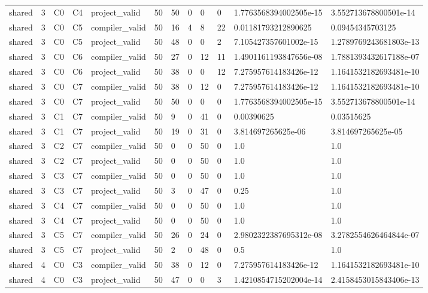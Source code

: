 \begin{tabular}{llllllllllll}
shared & 3 & C0 & C4 & project\_valid & 50 & 50 & 0 & 0 & 0 & 1.7763568394002505e-15 & 3.552713678800501e-14 \\
shared & 3 & C0 & C5 & compiler\_valid & 50 & 16 & 4 & 8 & 22 & 0.01181793212890625 & 0.09454345703125 \\
shared & 3 & C0 & C5 & project\_valid & 50 & 48 & 0 & 0 & 2 & 7.105427357601002e-15 & 1.2789769243681803e-13 \\
shared & 3 & C0 & C6 & compiler\_valid & 50 & 27 & 0 & 12 & 11 & 1.4901161193847656e-08 & 1.7881393432617188e-07 \\
shared & 3 & C0 & C6 & project\_valid & 50 & 38 & 0 & 0 & 12 & 7.275957614183426e-12 & 1.1641532182693481e-10 \\
shared & 3 & C0 & C7 & compiler\_valid & 50 & 38 & 0 & 12 & 0 & 7.275957614183426e-12 & 1.1641532182693481e-10 \\
shared & 3 & C0 & C7 & project\_valid & 50 & 50 & 0 & 0 & 0 & 1.7763568394002505e-15 & 3.552713678800501e-14 \\
shared & 3 & C1 & C7 & compiler\_valid & 50 & 9 & 0 & 41 & 0 & 0.00390625 & 0.03515625 \\
shared & 3 & C1 & C7 & project\_valid & 50 & 19 & 0 & 31 & 0 & 3.814697265625e-06 & 3.814697265625e-05 \\
shared & 3 & C2 & C7 & compiler\_valid & 50 & 0 & 0 & 50 & 0 & 1.0 & 1.0 \\
shared & 3 & C2 & C7 & project\_valid & 50 & 0 & 0 & 50 & 0 & 1.0 & 1.0 \\
shared & 3 & C3 & C7 & compiler\_valid & 50 & 0 & 0 & 50 & 0 & 1.0 & 1.0 \\
shared & 3 & C3 & C7 & project\_valid & 50 & 3 & 0 & 47 & 0 & 0.25 & 1.0 \\
shared & 3 & C4 & C7 & compiler\_valid & 50 & 0 & 0 & 50 & 0 & 1.0 & 1.0 \\
shared & 3 & C4 & C7 & project\_valid & 50 & 0 & 0 & 50 & 0 & 1.0 & 1.0 \\
shared & 3 & C5 & C7 & compiler\_valid & 50 & 26 & 0 & 24 & 0 & 2.9802322387695312e-08 & 3.2782554626464844e-07 \\
shared & 3 & C5 & C7 & project\_valid & 50 & 2 & 0 & 48 & 0 & 0.5 & 1.0 \\
shared & 4 & C0 & C3 & compiler\_valid & 50 & 38 & 0 & 12 & 0 & 7.275957614183426e-12 & 1.1641532182693481e-10 \\
shared & 4 & C0 & C3 & project\_valid & 50 & 47 & 0 & 0 & 3 & 1.4210854715202004e-14 & 2.4158453015843406e-13 \\

\end{tabular}
